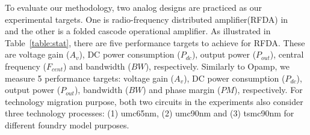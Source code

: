     To evaluate our methodology, two analog designs are practiced as our experimental targets. One is radio-frequency distributed amplifier(RFDA) in~\cite{PerfMap_ISQED2011} and the other is a folded cascode operational amplifier. As illustrated in Table~\ref{table:stat}, there are five performance targets to achieve for RFDA. These are voltage gain ($A_v$), DC power consumption ($P_{dc}$), output power ($P_{out}$), central frequency ($F_{cent}$) and bandwidth ($BW$), respectively. Similarly to Opamp, we measure 5 performance targets: voltage gain ($A_v$), DC power consumption ($P_{dc}$), output power ($P_{out}$), bandwidth ($BW$) and phase margin ($PM$), respectively. For technology migration purpose, both two circuits in the experiments also consider three technology processes: (1) umc65nm, (2) umc90nm and (3) tsmc90nm for different foundry model purposes. 
    \newsavebox{\tablebox}
    \begin{table}[ht]
      \begin{center}
      {\small
        \caption{Device statistics of RFDA and OpAmp}\label{table:stat}
        \begin{lrbox}{\tablebox}
          \end{lrbox}
        \scalebox{0.8}{\usebox{\tablebox}}
        }
      \end{center}
    \end{table}

